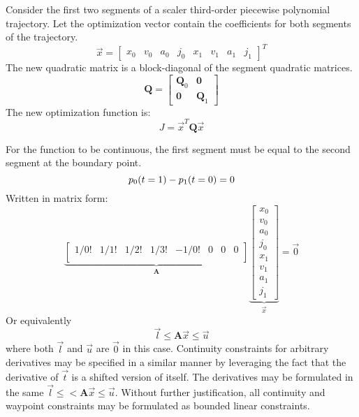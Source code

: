 \documentclass[12pt]{article}
\begin{document}
Consider the first two segments of a scaler third-order piecewise polynomial
trajectory. Let the optimization vector contain the coefficients for both
segments of the trajectory.
\begin{equation*}
  \vec{x} =
  \begin{bmatrix}
    x_{0} & v_{0} & a_{0} & j_{0} & x_{1} & v_{1} & a_{1} & j_{1}
  \end{bmatrix}^{T}
\end{equation*}
%
The new quadratic matrix is a block-diagonal of the segment quadratic matrices.
\begin{equation*}
  \mathbf{Q} = 
  \begin{bmatrix}
    \mathbf{Q}_{0} & \mathbf{0} \\
    \mathbf{0} & \mathbf{Q}_{1}
  \end{bmatrix}
\end{equation*}
%
The new optimization function is:
\begin{equation*}
  J = \vec{x}^T \mathbf{Q} \vec{x}
\end{equation*}

For the function to be continuous, the first segment must be equal to the second
segment at the boundary point.
\begin{equation*}
  p_{0}(t=1) - p_{1}(t=0) = 0 \\
\end{equation*}
%
Written in matrix form:
\begin{equation*}
  \underbrace{
  \begin{bmatrix}
    1/0! & 1/1! & 1/2! & 1/3! & -1/0! & 0 & 0 & 0 \\ 
  \end{bmatrix}
  }_{\mathbf{A}}
  \underbrace{
  \begin{bmatrix}
    x_{0} \\ 
    v_{0} \\
    a_{0} \\
    j_{0} \\
    x_{1} \\
    v_{1} \\
    a_{1} \\
    j_{1}
  \end{bmatrix}
  }_{\vec{x}}
  =
  \vec{0}
\end{equation*}
%
Or equivalently
\begin{equation*}
  \vec{l} \leq \mathbf{A} \vec{x} \leq \vec{u}
\end{equation*}
%
where both $\vec{l}$ and $\vec{u}$ are $\vec{0}$ in this case. Continuity
constraints for arbitrary derivatives may be specified in a similar manner by
leveraging the fact that the derivative of $\vec{t}$ is a shifted version of
itself. The derivatives may be formulated in the same $\vec{l} \leq < \mathbf{A}
\vec{x} \leq \vec{u}$. Without further justification, all continuity and
waypoint constraints may be formulated as bounded linear constraints.
\end{document}
